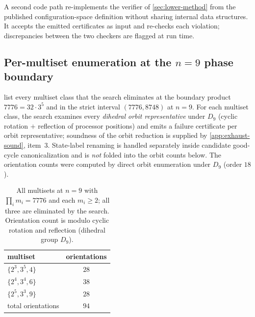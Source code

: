 \documentclass[11pt,a4paper]{article}
\theoremstyle{plain}
\theoremstyle{definition}
\begin{document}
A second code path re-implements the verifier of
\cref{sec:lower-method} from the published configuration-space
definition without sharing internal data structures.  It accepts the
emitted certificates as input and re-checks each violation;
discrepancies between the two checkers are flagged at run time.

\subsection{Per-multiset enumeration at the $n = 9$ phase boundary}\label{app:exhaust-n9}

 list every multiset class
that the search eliminates at the boundary product $7776 = 32 \cdot
3^5$ and in the strict interval $(7776, 8748)$ at $n = 9$.  For each
multiset class, the search examines every \emph{dihedral orbit
representative} under $D_9$ (cyclic rotation $+$ reflection of
processor positions) and emits a failure certificate per orbit
representative; soundness of the orbit reduction is supplied by
\cref{app:exhaust-sound}, item~3.  State-label renaming is handled
separately inside candidate good-cycle canonicalization and is
\emph{not} folded into the orbit counts below.  The orientation
counts were computed by direct orbit enumeration under $D_9$ (order
$18$).

\begin{table}[ht]
\centering
\caption{All multisets at $n = 9$ with $\prod_i m_i = 7776$ and
each $m_i \ge 2$; all three are eliminated by the search.
Orientation count is modulo cyclic rotation and reflection (dihedral
group $D_9$).}\label{tab:n9-7776}
\begin{tabular}{l c}
\toprule
multiset & orientations\\\midrule
$\{2^3, 3^5, 4\}$              & $28$\\
$\{2^4, 3^4, 6\}$              & $38$\\
$\{2^5, 3^3, 9\}$              & $28$\\\midrule
total orientations             & $94$\\
\bottomrule
\end{tabular}
\end{table}
\end{document}
